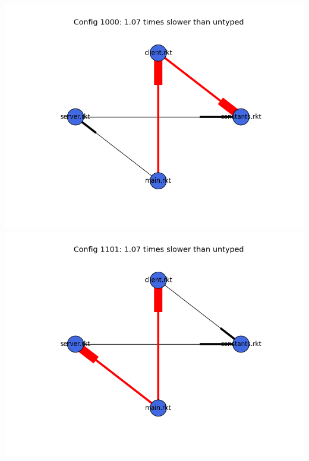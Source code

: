 \documentclass{article}
\begin{document}
\begin{itemize}
\includegraphics[width=\textwidth]{echo-module-graph-1000.png}
\includegraphics[width=\textwidth]{echo-module-graph-1101.png}
\end{itemize}
\end{document}
